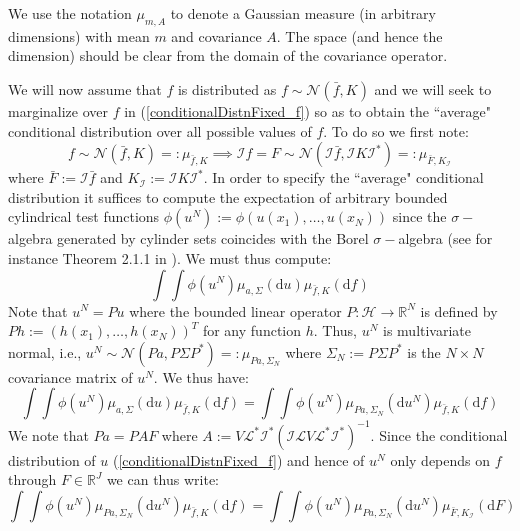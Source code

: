 \begin{remark}
We use the notation $\mu_{m,A}$ to denote a Gaussian measure (in arbitrary dimensions) with mean $m$ and covariance $A$. The space (and hence the dimension) should be clear from the domain of the covariance operator.
\end{remark}

We will now assume that $f$ is distributed as $f\sim\mathcal{N}(\bar{f},K)$ and we will seek to marginalize over $f$ in (\ref{conditionalDistnFixed_f}) so as to obtain the ``average" conditional distribution over all possible values of $f$. To do so we first note:
\begin{equation}
    f\sim\mathcal{N}(\bar{f},K)=:\mu_{\bar{f},K} \implies \mathcal{I}f=F\sim\mathcal{N}(\mathcal{I}\bar{f},\mathcal{I}K\mathcal{I}^{*})=:\mu_{\bar{F},K_{\mathcal{I}}}
\end{equation}
where $\bar{F}:=\mathcal{I}\bar{f}$ and $K_{\mathcal{I}}:=\mathcal{I}K\mathcal{I}^{*}$. In order to specify the ``average" conditional distribution it suffices to compute the expectation of arbitrary bounded cylindrical test functions $\phi(u^{N}):=\phi(u(x_1),\dots,u(x_{N}))$ since the $\sigma-$algebra generated by cylinder sets coincides with the Borel $\sigma-$algebra (see for instance Theorem 2.1.1 in \cite{lunardi2015infinite}). We must thus compute:
\begin{equation}
    \int\int\phi(u^{N})\mu_{a,\Sigma}(\mathrm{d}u)\mu_{\bar{f},K}(\mathrm{d}f)
\end{equation}
Note that $u^{N}=Pu$ where the bounded linear operator $P:\mathcal{H}\rightarrow\mathbb{R}^{N}$ is defined by $Ph:=(h(x_1),\dots,h(x_N))^T$ for any function $h$. Thus, $u^{N}$ is multivariate normal, i.e., $u^{N}\sim\mathcal{N}(Pa,P\Sigma P^{*})=:\mu_{Pa,\Sigma_{N}}$ where $\Sigma_{N}:=P\Sigma P^{*}$ is the $N\times N$ covariance matrix of $u^{N}$. We thus have:
\begin{equation}
    \int\int\phi(u^{N})\mu_{a,\Sigma}(\mathrm{d}u)\mu_{\bar{f},K}(\mathrm{d}f) = \int\int\phi(u^{N})\mu_{Pa,\Sigma_N}(\mathrm{d}u^{N})\mu_{\bar{f},K}(\mathrm{d}f)
\end{equation}
We note that $Pa=PAF$ where $A:= V\mathcal{L}^{*}\mathcal{I}^{*}(\mathcal{I}\mathcal{L}V\mathcal{L}^{*}\mathcal{I}^{*})^{-1}$. Since the conditional distribution of $u$ (\ref{conditionalDistnFixed_f}) and hence of $u^{N}$ only depends on $f$ through $F\in\mathbb{R}^{J}$ we can thus write:
\begin{equation}
    \int\int\phi(u^{N})\mu_{Pa,\Sigma_N}(\mathrm{d}u^{N})\mu_{\bar{f},K}(\mathrm{d}f)=\int\int\phi(u^{N})\mu_{Pa,\Sigma_N}(\mathrm{d}u^{N})\mu_{\bar{F},K_{\mathcal{I}}}(\mathrm{d}F)
\end{equation}
